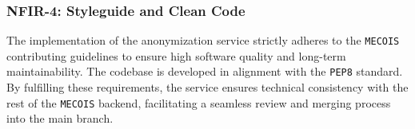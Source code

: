 \subsubsection{NFIR-4: Styleguide and Clean Code}

The implementation of the anonymization service strictly adheres to the \texttt{MECOIS} contributing guidelines to ensure high software quality and long-term maintainability. The codebase is developed in alignment with the \texttt{PEP8} standard. By fulfilling these requirements, the service ensures technical consistency with the rest of the \texttt{MECOIS} backend, facilitating a seamless review and merging process into the main branch.
